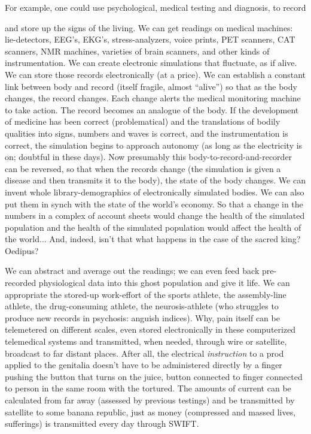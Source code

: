 For example, one could use psychological, medical testing and diagnosis, to record

and store up the signs of the living. We can
get readings on medical machines: lie-detectors, EEG's, EKG's, stress-analyzers, voice
prints, PET scanners, CAT scanners, NMR
machines, varieties of brain scanners, and
other kinds of instrumentation. We can
create electronic simulations that fluctuate,
as if alive. We can store those records electronically (at a price). We can establish a
constant link between body and record (itself fragile, almost \enquote{alive}) so that as the
body changes, the record changes. Each change alerts the medical monitoring machine to take action. The record becomes an
analogue of the body. If the development of
medicine has been correct (problematical)
and the translations of bodily qualities into
signs, numbers and waves is correct, and the
instrumentation is correct, the simulation
begins to approach autonomy (as long as the
electricity is on; doubtful in these days).
Now presumably this body-to-record-and-recorder can be reversed, so that when the
records change (the simulation is given a
disease and then transmits it to the body),
the state of the body changes. We can invent
whole library-demographics of electronically
simulated bodies. We can also put them in
synch with the state of the world's economy.
So that a change in the numbers in a complex
of account sheets would change the health of
the simulated population and the health of
the simulated population would affect the
health of the world... And, indeed, isn't that
what happens in the case of the sacred king?
Oedipus?

We can abstract and average out the readings; we can even feed back pre-recorded
physiological data into this ghost population and give it life. We can appropriate the
stored-up work-effort of the sports athlete,
the assembly-line athlete, the drug-consuming athlete, the neurosis-athlete (who struggles to produce new records in psychosis:
anguish indices). Why, pain itself can be
telemetered on different scales, even stored
electronically in these computerized telemedical systems and transmitted, when
needed, through wire or satellite, broadcast
to far distant places. After all, the electrical
\emph{instruction} to a prod applied to the genitalia
doesn't have to be administered directly by a
finger pushing the button that turns on the
juice, button connected to finger connected
to person in the same room with the tortured.
The amounts of current can be calculated
from far away (assessed by previous testings)
and be transmitted by satellite to some
banana republic, just as money (compressed
and massed lives, sufferings) is transmitted
every day through SWIFT.

